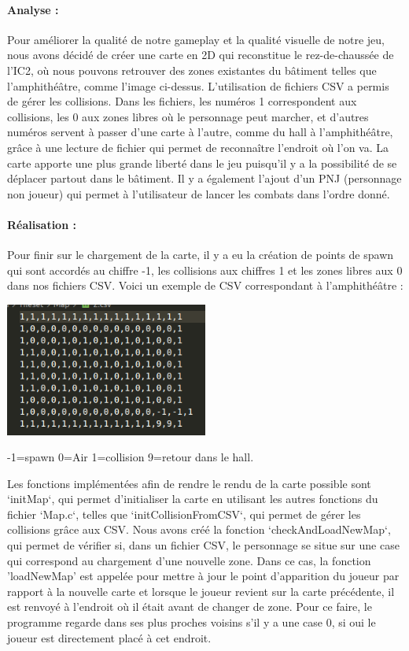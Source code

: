 \documentclass[12pt,a4paper, twoside]{article}
\begin{document}
    \paragraph{Analyse : }
   
    Pour améliorer la qualité de notre gameplay et la qualité visuelle de notre jeu, nous avons décidé de créer une carte en 2D qui reconstitue le rez-de-chaussée de l'IC2, où nous pouvons retrouver des
    zones existantes du bâtiment telles que l'amphithéâtre, comme l'image ci-dessus. L'utilisation de fichiers CSV a permis de gérer les collisions. Dans les fichiers, les numéros 1 correspondent 
    aux collisions, les 0 aux zones libres où le personnage peut marcher, et d'autres numéros servent à passer d'une carte à l'autre, comme du hall à l'amphithéâtre, grâce à une lecture de fichier qui permet
    de reconnaître l'endroit où l'on va. La carte apporte une plus grande liberté dans le jeu puisqu'il y a la possibilité de se déplacer partout dans le bâtiment. Il y a également l'ajout d'un PNJ
    (personnage non joueur) qui permet à l'utilisateur de lancer les combats dans l'ordre donné. 
    \newline
    \paragraph{Réalisation : }
    Pour finir sur le chargement de la carte, il y a eu la création de points de spawn qui sont accordés au chiffre -1, les collisions aux chiffres 1 et les zones libres aux 0 dans nos fichiers CSV. 
    Voici un exemple de CSV correspondant à l'amphithéâtre :
    \begin{center}
    \includegraphics[width=0.5\textwidth]{hall.png}
    \end{center}
    \begin{center}
        \small{-1=spawn 0=Air 1=collision 9=retour dans le hall.}
    \end{center}
    
    Les fonctions implémentées afin de rendre le rendu de la carte possible sont `initMap`, qui permet d'initialiser la carte en utilisant les autres fonctions du fichier `Map.c`, telles que `initCollisionFromCSV`,
    qui permet de gérer les collisions grâce aux CSV. Nous avons créé la fonction `checkAndLoadNewMap`, qui permet de vérifier si, dans un fichier CSV, le personnage se situe sur une case qui correspond au chargement d'une nouvelle zone. Dans ce cas, 
    la fonction 'loadNewMap' est appelée pour mettre à jour le point d'apparition du joueur par rapport à la nouvelle carte et lorsque le joueur revient sur la carte précédente, il est renvoyé à l'endroit où il était avant de changer de zone.
    Pour ce faire, le programme regarde dans ses plus proches voisins s'il y a une case 0, si oui le joueur est directement placé à cet endroit.
\end{document}
